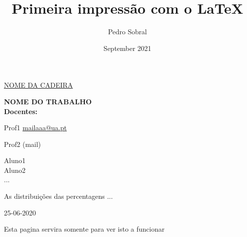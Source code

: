 \documentclass[12pt, letterpaper, twoside]{article}
\title{Primeira impressão com o \LaTeX}
\author{Pedro Sobral}
\date{September 2021}
\begin{document}
    

\begin{titlepage}
	\clearpage\thispagestyle{empty}
	\centering
	\vspace{2cm}
	{\Large\underline{NOME DA CADEIRA} \par}
	\vspace{0.5cm}
	\vspace{4cm}
	{\LARGE \textbf{NOME DO TRABALHO}} \\ \vspace{0.5cm}
	\vspace{5cm}
	{\normalsize \textbf{Docentes:} }
	{\small \par Prof1  \href{mailto:mailaaa@ua.pt}{mailaaa@ua.pt}  \par Prof2 (mail)\par}
	\vspace{2cm}
	{\normalsize Aluno1 \\ Aluno2 \\ ...\par}
    {\small As distribuições das percentagens ... \par \par}
	\vspace{2cm}
	{\normalsize 25-06-2020 \par}
	\pagebreak
\end{titlepage}

Esta pagina servira somente para ver isto a funcionar
\end{document}
